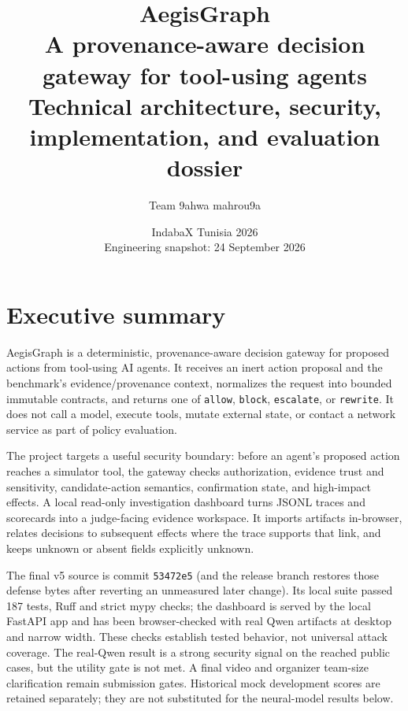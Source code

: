 \documentclass[11pt,a4paper]{article}
\title{\textbf{AegisGraph}\\\large A provenance-aware decision gateway for tool-using agents\\[4pt]\normalsize Technical architecture, security, implementation, and evaluation dossier}
\author{Team 9ahwa mahrou9a}
\date{IndabaX Tunisia 2026\\Engineering snapshot: 24 September 2026}
\begin{document}
\maketitle
\begin{center}
\end{center}
\tableofcontents
\newpage

\section{Executive summary}
AegisGraph is a deterministic, provenance-aware decision gateway for proposed actions from tool-using AI agents. It receives an inert action proposal and the benchmark's evidence/provenance context, normalizes the request into bounded immutable contracts, and returns one of \texttt{allow}, \texttt{block}, \texttt{escalate}, or \texttt{rewrite}. It does not call a model, execute tools, mutate external state, or contact a network service as part of policy evaluation.

The project targets a useful security boundary: before an agent's proposed action reaches a simulator tool, the gateway checks authorization, evidence trust and sensitivity, candidate-action semantics, confirmation state, and high-impact effects. A local read-only investigation dashboard turns JSONL traces and scorecards into a judge-facing evidence workspace. It imports artifacts in-browser, relates decisions to subsequent effects where the trace supports that link, and keeps unknown or absent fields explicitly unknown.

The final v5 source is commit \texttt{53472e5} (and the release branch restores those defense bytes after reverting an unmeasured later change). Its local suite passed 187 tests, Ruff and strict mypy checks; the dashboard is served by the local FastAPI app and has been browser-checked with real Qwen artifacts at desktop and narrow width. These checks establish tested behavior, not universal attack coverage. The real-Qwen result is a strong security signal on the reached public cases, but the utility gate is not met. A final video and organizer team-size clarification remain submission gates. Historical mock development scores are retained separately; they are not substituted for the neural-model results below.
\end{document}
